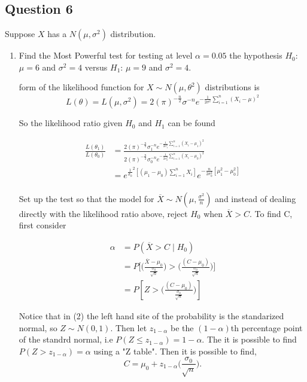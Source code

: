\documentclass{tufte-book}
\theoremstyle{mytheoremstyle}
\theoremstyle{mylemstyle}
\theoremstyle{mydefstyle}
\begin{document}
\subsection{Question 6}
Suppose $X$ has a $N(\mu, \sigma^2)$ distribution.
\begin{enumerate}
\item Find the Most Powerful test for testing at level $\alpha=0.05$ the hypothesis $H_0$:$\mu = 6$ and $\sigma^2=4$ versus $H_1$: $\mu=9$ and $\sigma^2=4$.

 form of the likelihood function for $X \sim N(\mu, \theta^2)$ distributions is
\[ L(\theta) = L(\mu, \sigma^2) = 2(\pi)^{-\frac{n}{2}} \sigma^{-n} e^{-\frac{1}{2\sigma^2}\sum_{i=1}^n(X_i-\mu)^2} \]

So the likelihood ratio given $H_0$ and $H_1$ can be found 

\begin{align*}
\frac{ L(\theta_1)}{L(\theta_0)} &= \frac{2(\pi)^{-\frac{n}{2}} \sigma_1^{-n} e^{-\frac{1}{2\sigma_1^2}\sum_{i=1}^n(X_i-\mu_1)^2}}{2(\pi)^{-\frac{n}{2}} \sigma_0^{-n} e^{-\frac{1}{2\sigma_0^2}\sum_{i=1}^n(X_i-\mu_0)^2}}\\
&=e^{\frac{1}{\sigma_0}^2 [(\mu_1-\mu_0)\sum_{i=1}^nX_i]} e^{-\frac{n}{2\sigma_0^2}[\mu_1^2 -\mu_0^2]}\\
\end{align*}

Set up the test so that the model for $\overline{X} \sim N(\mu, \frac{\sigma^2}{n})$ and instead of dealing directly with the likelihood ratio above, reject $H_0$ when $\overline{X} > C$.  To find C, first consider

\begin{align}
\alpha &= P(\overline{X} > C \mid H_0)\\
&=P\Big[\Big(\frac{\overline{X} - \mu_0}{\frac{\sigma_0}{\sqrt{n}}}\Big) > \Big(\frac{(C- \mu_0)}{\frac{\sigma_0}{\sqrt{n}}}\Big) \Big]\\
&= P[Z > \Big(\frac{(C- \mu_0)}{\frac{\sigma_0}{\sqrt{n}}}\Big) ]
\end{align}

Notice that in (2) the left hand site of the probability is the standarized normal, so $Z \sim N(0,1)$.  Then let $z_{1-\alpha}$ be the $(1-\alpha)$th percentage point of the standrd normal, i.e $P(Z \leq z_{1-\alpha}) = 1-\alpha$.  The it is possible to find $P(Z>z_{1-\alpha}) = \alpha$ using a "Z table".  Then it is possible to find,
\[C = \mu_0 + z_{1-\alpha}\Big(\frac{\sigma_0}{\sqrt{n}}\Big).\]


\end{enumerate}
\end{document}
